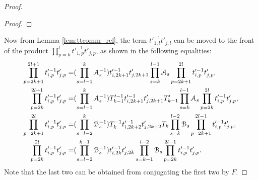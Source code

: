 \documentclass{amsart}
\begin{document}
\begin{proof}
\begin{proof}
\end{proof}

Now from Lemma \ref{lem:ttcomm_rel}, the term $t'^{-1}_{1,l}t'_{j,l}$ can be moved to the front of the product $\prod^{l}_{p=k}t'^{-1}_{1,p}t'_{j,p}$, as shown in the following equalities:
\[
\begin{aligned}
\prod^{2l+1}_{p=2k+1}t'^{-1}_{i,p}t'_{j,p}=&(\prod ^{k}_{s=l-1}\mathcal{A}^{-1}_s)t'^{-1}_{i,2k+1}t'_{j,2k+1}\prod ^{l-1}_{s=k}\mathcal{A}_s\prod^{2l}_{p=2k+1}t'^{-1}_{i,p}t'_{j,p},\\  
\prod^{2l+1}_{p=2k}t'^{-1}_{i,p}t'_{j,p}=&(\prod ^{k}_{s=l-1}\mathcal{A}^{-1}_s)T'^{-1}_{k-1}t'^{-1}_{i,2k+1}t'_{j,2k+1}T'_{k-1}\prod ^{l-1}_{s=k}\mathcal{A}_s\prod^{2l}_{p=2k}t'^{-1}_{i,p}t'_{j,p},\\
\prod^{2l}_{p=2k+1}t'^{-1}_{i,p}t'_{j,p}=&(\prod ^{k}_{s=l-2}\mathcal{B}^{-1}_s)T^{-1}_kt'^{-1}_{i,2k+2}t'_{j,2k+2}T_k\prod ^{l-2}_{s=k}\mathcal{B}_s\prod^{2l-1}_{p=2k+1}t'^{-1}_{i,p}t'_{j,p},\\  
\prod^{2l}_{p=2k}t'^{-1}_{i,p}t'_{j,p}=&(\prod ^{k-1}_{s=l-2}\mathcal{B}^{-1}_s)t'^{-1}_{i,2k}t'_{j,2k}\prod^{l-2}_{s=k-1}\mathcal{B}_s\prod^{2l-1}_{p=2k}t'^{-1}_{i,p}t'_{j,p}.
\end{aligned}
\]
Note that the last two can be obtained from conjugating the first two by $F$.


\end{proof}
\end{document}
